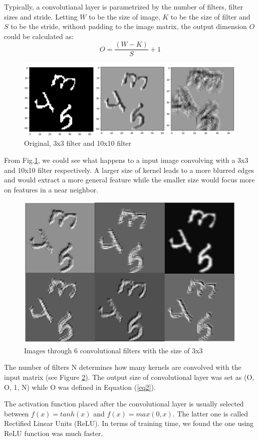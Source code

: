 \documentclass[10pt,conference]{IEEEtran}
\begin{document}
Typically, a convolutianal layer is parametrized by the number of filters, filter sizes and stride. Letting $W$ to be the size of image, $K$ to be the size of filter and $S$ to be the stride, without padding to the image matrix, the output dimension $O$ could be calculated as:
\begin{equation}\label{eq2}
O=\frac{(W-K)}{S}+1
\end{equation}

\begin{figure}[!tbhp]
\centering
\includegraphics[width = 0.6\linewidth]{filter_size.jpg}
\caption{Original, 3x3 filter and 10x10 filter}
\label{fig:filter}
\end{figure}

From Fig.\ref{fig:filter}, we could see what happens to a input image convolving with a 3x3 and 10x10 filter respectively. A larger size of kernel leads to a more blurred edges and would extract a more general feature while the smaller size would focus more on features in a near neighbor.

\begin{figure}[!tbhp]
\centering
\includegraphics[width = 0.5\linewidth]{filters.jpg}
\caption{Images through 6 convolutional filters with the size of 3x3}
\label{fig:diff_filter}
\end{figure}

The number of filters N determines how many kernels are convolved with the input matrix (see Figure \ref{fig:diff_filter}). The output size of convolutional layer was set as (O, O, 1, N) while O was defined in Equation (\ref{eq2}). 

The activation function placed after the convolutional layer is usually selected between $f(x)=tanh(x)$ and $f(x)=max(0,x)$. The latter one is called Rectified Linear Units (ReLU). In terms of training time, we found the one using ReLU function was much faster.
\end{document}
